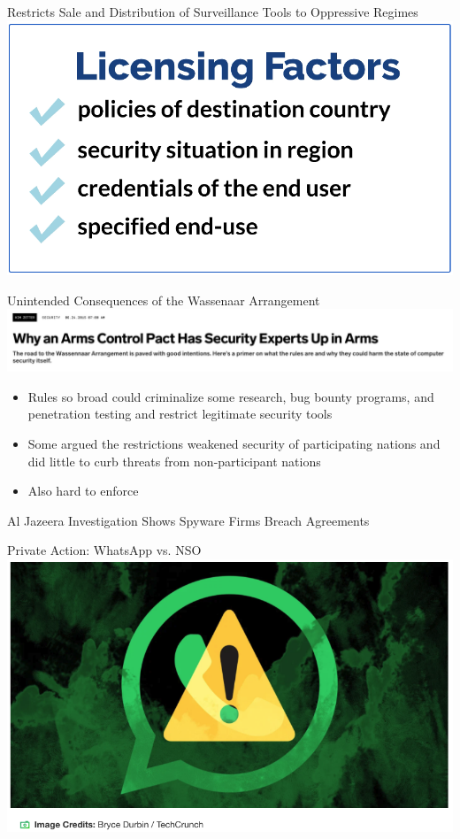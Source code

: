 \documentclass[nobackground,dvipsnames,table,aspectratio=169]{beamer}
\begin{document}
\begin{frame}{Restricts Sale and Distribution of Surveillance Tools to Oppressive Regimes}
    \includegraphics[width=\textwidth]{wassenaar-licensing-factors}
\end{frame}

\begin{frame}{Unintended Consequences of the Wassenaar Arrangement}
    \includegraphics[width=\textwidth]{wired-arms-control}
    \begin{itemize}
        \item Rules so broad could criminalize some research, bug bounty programs, and penetration testing and restrict legitimate security tools 
        \item Some argued the restrictions weakened security of participating nations and did little to curb threats from non-participant nations
        \item Also hard to enforce 
    \end{itemize}
\end{frame}

\begin{frame}{Al Jazeera Investigation Shows Spyware Firms Breach Agreements}
\end{frame}

\begin{frame}{Private Action: WhatsApp vs. NSO }
    \includegraphics[width=\textwidth]{nso-whatsapp}
\end{frame}
\end{document}
